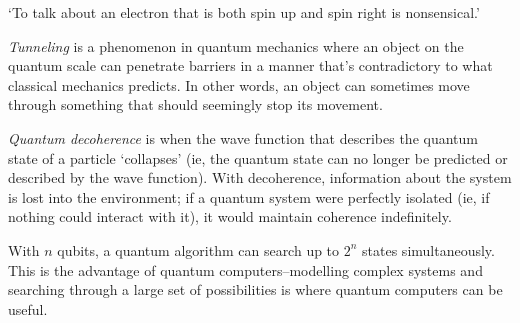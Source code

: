 `To talk about an electron that is both spin up and spin right is nonsensical.'

\begin{definition}
    \emph{Tunneling} is a phenomenon in quantum mechanics where an object on the quantum scale can penetrate barriers in a manner that's contradictory to what classical mechanics predicts. In other words, an object can sometimes move through something that should seemingly stop its movement.
\end{definition}

\begin{definition}
    \emph{Quantum decoherence} is when the wave function that describes the quantum state of a particle `collapses' (ie, the quantum state can no longer be predicted or described by the wave function). With decoherence, information about the system is lost into the environment; if a quantum system were perfectly isolated (ie, if nothing could interact with it), it would maintain coherence indefinitely.
\end{definition}

With $n$ qubits, a quantum algorithm can search up to $2^n$ states simultaneously. This is the advantage of quantum computers--modelling complex systems and searching through a large set of possibilities is where quantum computers can be useful.


